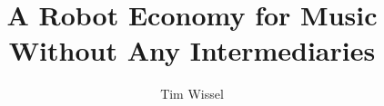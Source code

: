 \documentclass[whitelogo]{tudelft-report}
\begin{document}
\frontmatter


\title[tudelft-white]{A Robot Economy for Music Without Any Intermediaries}
\author[tudelft-white]{Tim Wissel}
\makecover[split]






\tableofcontents

\mainmatter








\appendix

%


\end{document}
